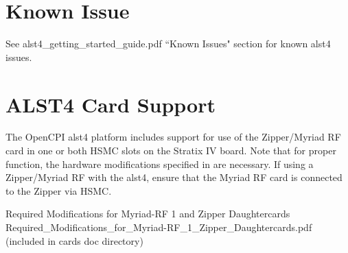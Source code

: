\documentclass{article}
\begin{document}
\section*{Known Issue}
See alst4\_getting\_started\_guide.pdf ``Known Issues" section for known alst4 issues.
\section*{ALST4 Card Support}
The OpenCPI alst4 platform includes support for use of the Zipper/Myriad RF card in one or both HSMC slots on the Stratix IV board. Note that for proper function, the hardware modifications specified in \cite{zipper_mods} are necessary. If using a Zipper/Myriad RF with the alst4, ensure that the Myriad RF card is connected to the Zipper via HSMC.

\pagebreak
  \begin{thebibliography}{1}

   Required Modifications for Myriad-RF 1 and Zipper Daughtercards\\
	 Required\_Modifications\_for\_Myriad-RF\_1\_Zipper\_Daughtercards.pdf (included in cards doc directory)

  \end{thebibliography}
\end{document}
